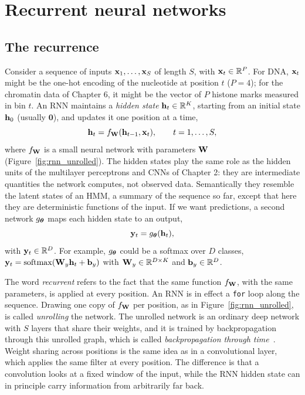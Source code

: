\section{Recurrent neural networks}
\label{sec:rnn}

\subsection{The recurrence}

Consider a sequence of inputs $\mathbf{x}_1,\dots,\mathbf{x}_S$ of length $S$, with $\mathbf{x}_t\in\mathbb{R}^P$. For DNA, $\mathbf{x}_t$ might be the one-hot encoding of the nucleotide at position $t$ ($P=4$); for the chromatin data of Chapter 6, it might be the vector of $P$ histone marks measured in bin $t$. An RNN maintains a \emph{hidden state} $\mathbf{h}_t\in\mathbb{R}^K$, starting from an initial state $\mathbf{h}_0$ (usually $\mathbf{0}$), and updates it one position at a time,
\begin{equation}
  \mathbf{h}_t = f_{\mathbf{W}}(\mathbf{h}_{t-1},\mathbf{x}_t), \qquad t=1,\dots,S,
  \label{eq:rnn}
\end{equation}
where $f_{\mathbf{W}}$ is a small neural network with parameters $\mathbf{W}$ (Figure~\ref{fig:rnn_unrolled}). The hidden states play the same role as the hidden units of the multilayer perceptrons and CNNs of Chapter 2: they are intermediate quantities the network computes, not observed data. Semantically they resemble the latent states of an HMM, a summary of the sequence so far, except that here they are deterministic functions of the input. If we want predictions, a second network $g_{\boldsymbol{\theta}}$ maps each hidden state to an output,
\begin{equation}
  \mathbf{y}_t = g_{\boldsymbol{\theta}}(\mathbf{h}_t),
  \label{eq:rnn_out}
\end{equation}
with $\mathbf{y}_t\in\mathbb{R}^D$. For example, $g_{\boldsymbol{\theta}}$ could be a softmax over $D$ classes, $\mathbf{y}_t=\operatorname{softmax}(\mathbf{W}_y\mathbf{h}_t+\mathbf{b}_y)$ with $\mathbf{W}_y\in\mathbb{R}^{D\times K}$ and $\mathbf{b}_y\in\mathbb{R}^D$.

The word \emph{recurrent} refers to the fact that the same function $f_{\mathbf{W}}$, with the same parameters, is applied at every position. An RNN is in effect a \texttt{for} loop along the sequence. Drawing one copy of $f_{\mathbf{W}}$ per position, as in Figure~\ref{fig:rnn_unrolled}, is called \emph{unrolling} the network. The unrolled network is an ordinary deep network with $S$ layers that share their weights, and it is trained by backpropagation through this unrolled graph, which is called \emph{backpropagation through time}~\citep{werbos1990}. Weight sharing across positions is the same idea as in a convolutional layer, which applies the same filter at every position. The difference is that a convolution looks at a fixed window of the input, while the RNN hidden state can in principle carry information from arbitrarily far back.

